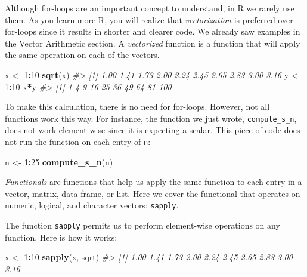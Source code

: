 \documentclass[
]{krantz}
\newenvironment{Shaded}{\begin{snugshade}}{\end{snugshade}}
\newcommand{\CommentTok}[1]{\textcolor[rgb]{0.37,0.37,0.37}{\textit{#1}}}
\newcommand{\DecValTok}[1]{\textcolor[rgb]{0.06,0.06,0.06}{#1}}
\newcommand{\KeywordTok}[1]{\textcolor[rgb]{0.27,0.27,0.27}{\textbf{#1}}}
\newcommand{\NormalTok}[1]{#1}
\newcommand{\OperatorTok}[1]{\textcolor[rgb]{0.43,0.43,0.43}{\textbf{#1}}}
\newcommand{\StringTok}[1]{\textcolor[rgb]{0.5,0.5,0.5}{#1}}
\begin{document}
Although for-loops are an important concept to understand, in R we rarely use them. As you learn more R, you will realize that \emph{vectorization} is preferred over for-loops since it results in shorter and clearer code. We already saw examples in the Vector Arithmetic section. A \emph{vectorized} function is a function that will apply the same operation on each of the vectors.

\begin{Shaded}
\begin{Highlighting}[]
\NormalTok{x <-}\StringTok{ }\DecValTok{1}\OperatorTok{:}\DecValTok{10}
\KeywordTok{sqrt}\NormalTok{(x)}
\CommentTok{#>  [1] 1.00 1.41 1.73 2.00 2.24 2.45 2.65 2.83 3.00 3.16}
\NormalTok{y <-}\StringTok{ }\DecValTok{1}\OperatorTok{:}\DecValTok{10}
\NormalTok{x}\OperatorTok{*}\NormalTok{y}
\CommentTok{#>  [1]   1   4   9  16  25  36  49  64  81 100}
\end{Highlighting}
\end{Shaded}

To make this calculation, there is no need for for-loops. However, not all functions work this way. For instance, the function we just wrote, \texttt{compute\_s\_n}, does not work element-wise since it is expecting a scalar. This piece of code does not run the function on each entry of \texttt{n}:

\begin{Shaded}
\begin{Highlighting}[]
\NormalTok{n <-}\StringTok{ }\DecValTok{1}\OperatorTok{:}\DecValTok{25}
\KeywordTok{compute_s_n}\NormalTok{(n)}
\end{Highlighting}
\end{Shaded}

\emph{Functionals} are functions that help us apply the same function to each entry in a vector, matrix, data frame, or list. Here we cover the functional that operates on numeric, logical, and character vectors: \texttt{sapply}.

The function \texttt{sapply} permits us to perform element-wise operations on any function. Here is how it works:

\begin{Shaded}
\begin{Highlighting}[]
\NormalTok{x <-}\StringTok{ }\DecValTok{1}\OperatorTok{:}\DecValTok{10}
\KeywordTok{sapply}\NormalTok{(x, sqrt)}
\CommentTok{#>  [1] 1.00 1.41 1.73 2.00 2.24 2.45 2.65 2.83 3.00 3.16}
\end{Highlighting}
\end{Shaded}
\end{document}

